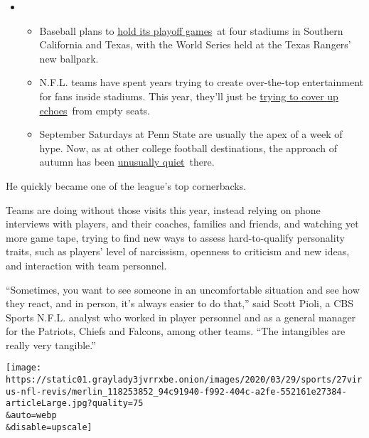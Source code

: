 \begin{itemize}
\item
  \begin{itemize}
  \tightlist
  \item
    Baseball plans to
    \href{https://www.nytimes3xbfgragh.onion/2020/09/10/sports/baseball/mlb-postseason-neutral-sites.html?action=click\&pgtype=Article\&state=default\&region=MAIN_CONTENT_2\&context=storylines_keepup}{hold
    its playoff games}~at four stadiums in Southern California and
    Texas, with the World Series held at the Texas Rangers' new
    ballpark.
  \item
    N.F.L. teams have spent years trying to create over-the-top
    entertainment for fans inside stadiums. This year, they'll just be
    \href{https://www.nytimes3xbfgragh.onion/2020/09/10/sports/football/what-will-nfl-games-sound-like.html?action=click\&pgtype=Article\&state=default\&region=MAIN_CONTENT_2\&context=storylines_keepup}{trying
    to cover up echoes}~from empty seats.
  \item
    September Saturdays at Penn State are usually the apex of a week of
    hype. Now, as at other college football destinations, the approach
    of autumn has been
    \href{https://www.nytimes3xbfgragh.onion/2020/09/09/sports/penn-state-college-football-canceled.html?action=click\&pgtype=Article\&state=default\&region=MAIN_CONTENT_2\&context=storylines_keepup}{unusually
    quiet}~there.
  \end{itemize}
\end{itemize}

He quickly became one of the league's top cornerbacks.

Teams are doing without those visits this year, instead relying on phone
interviews with players, and their coaches, families and friends, and
watching yet more game tape, trying to find new ways to assess
hard-to-qualify personality traits, such as players' level of
narcissism, openness to criticism and new ideas, and interaction with
team personnel.

``Sometimes, you want to see someone in an uncomfortable situation and
see how they react, and in person, it's always easier to do that,'' said
Scott Pioli, a CBS Sports N.F.L. analyst who worked in player personnel
and as a general manager for the Patriots, Chiefs and Falcons, among
other teams. ``The intangibles are really very tangible.''

\texttt{[image: https://static01.graylady3jvrrxbe.onion/images/2020/03/29/sports/27virus-nfl-revis/merlin\_118253852\_94c91940-f992-404c-a2fe-552161e27384-articleLarge.jpg?quality=75\\\&auto=webp\\\&disable=upscale]}

